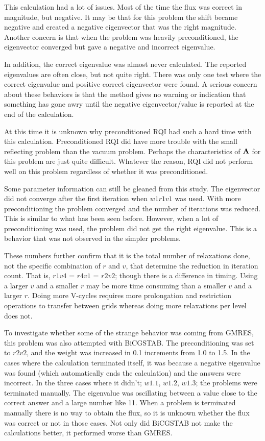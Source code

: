 This calculation had a lot of issues. Most of the time the flux was correct in magnitude, but negative. It may be that for this problem the shift became negative and created a negative eigenvector that was the right magnitude. Another concern is that when the problem was heavily preconditioned, the eigenvector converged but gave a negative and incorrect eigenvalue. 

In addition, the correct eigenvalue was almost never calculated. The reported eigenvalues are often close, but not quite right. There was only one test where the correct eigenvalue and positive correct eigenvector were found. A serious concern about these behaviors is that the method gives no warning or indication that something has gone awry until the negative eigenvector/value is reported at the end of the calculation. 

At this time it is unknown why preconditioned RQI had such a hard time with this calculation. Preconditioned RQI did have more trouble with the small reflecting problem than the vacuum problem. Perhaps the characteristics of $\mathbf{A}$ for this problem are just quite difficult. Whatever the reason, RQI did not perform well on this problem regardless of whether it was preconditioned.  

Some parameter information can still be gleaned from this study. The eigenvector did not converge after the first iteration when $w1r1v1$ was used. With more preconditioning the problem converged and the number of iterations was reduced. This is similar to what has been seen before. However, when a lot of preconditioning was used, the problem did not get the right eigenvalue. This is a behavior that was not observed in the simpler problems. 

These numbers further confirm that it is the total number of relaxations done, not the specific combination of $r$ and $v$, that determine the reduction in iteration count. That is, $r1v4$ = $r4v1$ = $r2v2$; though there is a difference in timing. Using a larger $v$ and a smaller $r$ may be more time consuming than a smaller $v$ and a larger $r$. Doing more V-cycles requires more prolongation and restriction operations to transfer between grids whereas doing more relaxations per level does not. 

To investigate whether some of the strange behavior was coming from GMRES, this problem was also attempted with BiCGSTAB. The preconditioning was set to $r2v2$, and the weight was increased in 0.1 increments from 1.0 to 1.5. In the cases where the calculation terminated itself, it was because a negative eigenvalue was found (which automatically ends the calculation) and the answers were incorrect. In the three cases where it didn't; $w1.1$, $w1.2$, $w1.3$; the problems were terminated manually. The eigenvalue was oscillating between a value close to the correct answer and a large number like 11. When a problem is terminated manually there is no way to obtain the flux, so it is unknown whether the flux was correct or not in those cases. Not only did BiCGSTAB not make the calculations better, it performed worse than GMRES.

